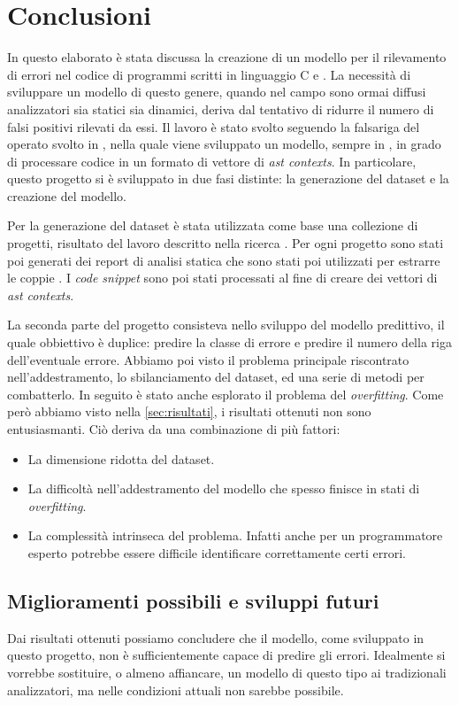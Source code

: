 \chapter{Conclusioni}
In questo elaborato è stata discussa la creazione di un modello per il rilevamento di errori nel codice di programmi scritti in linguaggio C e \CPP.
La necessità di sviluppare un modello di questo genere, quando nel campo sono ormai diffusi analizzatori sia statici sia dinamici, deriva dal tentativo di ridurre il numero di falsi positivi rilevati da essi.
Il lavoro è stato svolto seguendo la falsariga del operato svolto in \cite{alon2019code2vec}, nella quale viene sviluppato un modello, sempre in \DL{}, in grado di processare codice in un formato di vettore di \textit{ast contexts}.
In particolare, questo progetto si è sviluppato in due fasi distinte: la generazione del dataset e la creazione del modello.

Per la generazione del dataset è stata utilizzata come base una collezione di progetti, risultato del lavoro descritto nella ricerca \cite{gelman2019source}.
Per ogni progetto sono stati poi generati dei report di analisi statica che sono stati poi utilizzati per estrarre le coppie .
I \textit{code snippet} sono poi stati processati al fine di creare dei vettori di \textit{ast contexts}.

La seconda parte del progetto consisteva nello sviluppo del modello predittivo, il quale obbiettivo è duplice: predire la classe di errore e predire il numero della riga dell'eventuale errore.
Abbiamo poi visto il problema principale riscontrato nell'addestramento, lo sbilanciamento del dataset, ed una serie di metodi per combatterlo. 
In seguito è stato anche esplorato il problema del \textit{overfitting}.
Come però abbiamo visto nella \autoref{sec:risultati}, i risultati ottenuti non sono entusiasmanti. 
Ciò deriva da una combinazione di più fattori:
    \begin{itemize}
        \item La dimensione ridotta del dataset.
        \item La difficoltà nell'addestramento del modello che spesso finisce in stati di \textit{overfitting}.
        \item La complessità intrinseca del problema. Infatti anche per un programmatore esperto potrebbe essere difficile identificare correttamente certi errori.
    \end{itemize}

\section{Miglioramenti possibili e sviluppi futuri}
Dai risultati ottenuti possiamo concludere che il modello, come sviluppato in questo progetto, non è sufficientemente capace di predire gli errori.
Idealmente si vorrebbe sostituire, o almeno affiancare, un modello di questo tipo ai tradizionali analizzatori, ma nelle condizioni attuali non sarebbe possibile.

